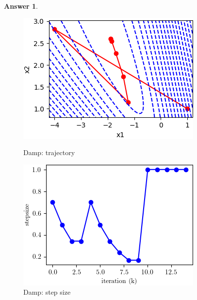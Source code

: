 \documentclass{article}
\theoremstyle{definition}
\newtheorem{ans}{Answer}
\begin{document}
\begin{ans}
\begin{enumerate}[(a)]
			\begin{figure}[h]
				\begin{minipage}[t]{0.33\linewidth}
					\centering
					\includegraphics[width=1\linewidth]{../figures/1b/dnt_traces}
					\caption{Damp: trajectory}
					\label{p13}
				\end{minipage}
				\begin{minipage}[t]{0.33\linewidth}
					\centering
					\includegraphics[width=1\linewidth]{../figures/1b/dnt_ss}
					\caption{Damp: step size}
					\label{p14}
				\end{minipage}
				\begin{minipage}[t]{0.33\linewidth}
					\centering

\end{minipage}
\end{figure}
\end{enumerate}
\end{ans}
\end{document}
